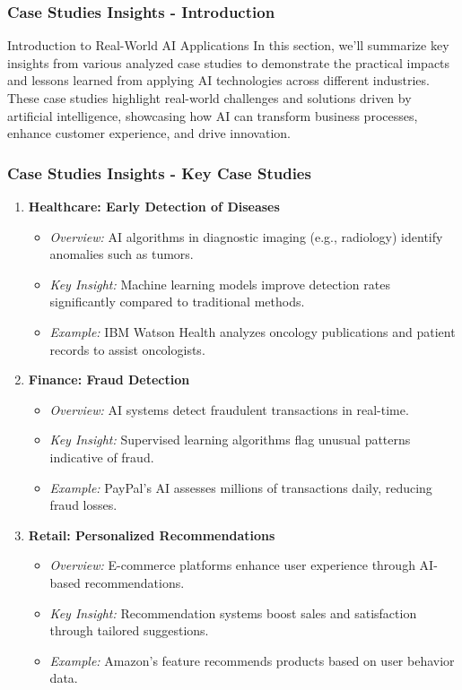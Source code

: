 \documentclass{beamer}
\begin{document}
\begin{frame}[fragile]
    \frametitle{Case Studies Insights - Introduction}
    \begin{block}{Introduction to Real-World AI Applications}
        In this section, we'll summarize key insights from various analyzed case studies to demonstrate the practical impacts and lessons learned from applying AI technologies across different industries. 
        These case studies highlight real-world challenges and solutions driven by artificial intelligence, showcasing how AI can transform business processes, enhance customer experience, and drive innovation.
    \end{block}
\end{frame}

\begin{frame}[fragile]
    \frametitle{Case Studies Insights - Key Case Studies}
    \begin{enumerate}
        \item \textbf{Healthcare: Early Detection of Diseases}
            \begin{itemize}
                \item \textit{Overview:} AI algorithms in diagnostic imaging (e.g., radiology) identify anomalies such as tumors.
                \item \textit{Key Insight:} Machine learning models improve detection rates significantly compared to traditional methods.
                \item \textit{Example:} IBM Watson Health analyzes oncology publications and patient records to assist oncologists.
            \end{itemize}
        
        \item \textbf{Finance: Fraud Detection}
            \begin{itemize}
                \item \textit{Overview:} AI systems detect fraudulent transactions in real-time.
                \item \textit{Key Insight:} Supervised learning algorithms flag unusual patterns indicative of fraud.
                \item \textit{Example:} PayPal's AI assesses millions of transactions daily, reducing fraud losses.
            \end{itemize}
        
        \item \textbf{Retail: Personalized Recommendations}
            \begin{itemize}
                \item \textit{Overview:} E-commerce platforms enhance user experience through AI-based recommendations.
                \item \textit{Key Insight:} Recommendation systems boost sales and satisfaction through tailored suggestions.
                \item \textit{Example:} Amazon's feature recommends products based on user behavior data.
            \end{itemize}
        

\end{enumerate}
\end{frame}
\end{document}
